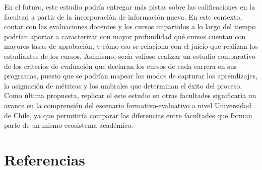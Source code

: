 \documentclass[
  spanish,
  a4paper,
  oneside]{scrbook}
\begin{document}
En el futuro, este estudio podría entregar más pistas sobre las
calificaciones en la facultad a partir de la incorporación de
información nueva. En este contexto, contar con las evaluaciones
docentes y los cursos impartidos a lo largo del tiempo podrían aportar a
caracterizar con mayor profundidad qué cursos cuentan con mayores tasas
de aprobación, y cómo eso se relaciona con el juicio que realizan los
estudiantes de los cursos. Asimismo, sería valioso realizar un estudio
comparativo de los criterios de evaluación que declaran los cursos de
cada carrera en sus programas, puesto que se podrían mapear los modos de
capturar los aprendizajes, la asignación de métricas y los umbrales que
determinan el éxito del proceso. Como última propuesta, replicar el este
estudio en otras facultades significaría un avance en la comprensión del
escenario formativo-evaluativo a nivel Universidad de Chile, ya que
permitiría comparar las diferencias entre facultades que forman parte de
un mismo ecosistema académico.


\chapter{Referencias}\label{referencias}
\end{document}
